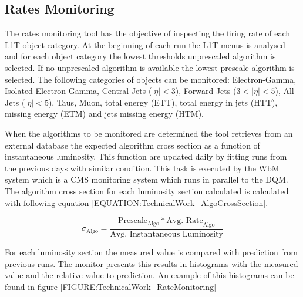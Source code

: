 \subsection{Rates Monitoring}
\label{SECTION:TechnicalWork_L1TDQM_RatesMonitoring}


The rates monitoring tool has the objective of inspecting the firing rate of each \gls{L1T} object category. At the beginning of each run the \gls{L1T} menus is analysed and for each object category the lowest thresholds unprescaled algorithm is selected. If no unprescaled algorithm is available the lowest prescale algorithm is selected. The following categories of objects can be monitored: Electron-Gamma, Isolated Electron-Gamma, Central Jets ($|\eta|<3$), Forward Jets ($3<|\eta|<5$), All Jets ($|\eta|<5$), Taus, Muon, total energy (ETT), total energy in jets (HTT), missing energy (ETM) and jets missing energy (HTM).

When the algorithms to be monitored are determined the tool retrieves from an external database the expected algorithm cross section as a function of instantaneous luminosity. This function are updated daily by fitting runs from the previous days with similar condition. This task is executed by the \gls{WbM} system which is a \gls{CMS} monitoring system which runs in parallel to the \gls{DQM}. The algorithm cross section for each luminosity section calculated is calculated with following equation \ref{EQUATION:TechnicalWork_AlgoCrossSection}.

\begin{equation}
\sigma_{\text{Algo}}=\frac{\text{Prescale}_{\text{Algo}}*{\text{Avg. Rate}_{\text{Algo}}}}{\text{Avg. Instantaneous Luminosity}}
\label{EQUATION:TechnicalWork_AlgoCrossSection}
\end{equation}

For each luminosity section the measured value is compared with prediction from previous runs. The monitor presents this results in histograms with the measured value and the relative value to prediction. An example of this histograms can be found in figure \ref{FIGURE:TechnicalWork_RateMonitoring}

